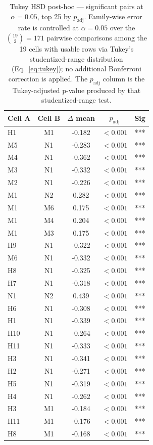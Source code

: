 \begin{table}[!htbp]
\centering
\caption{Tukey HSD post-hoc — significant pairs at $\alpha = 0.05$, top 25 by $p_{\text{adj}}$. Family-wise error rate is controlled at $\alpha = 0.05$ over the $\binom{19}{2} = 171$ pairwise comparisons among the 19 cells with usable rows via Tukey's studentized-range distribution (Eq.~\ref{eq:tukey}); no additional Bonferroni correction is applied. The $p_{\text{adj}}$ column is the Tukey-adjusted p-value produced by that studentized-range test.}
\label{tab:tukey_significant}
\begin{tabular}{@{}lcccc@{}}
\toprule
Cell A & Cell B & $\Delta$ mean & $p_{\text{adj}}$ & Sig \\
\midrule
H1 & M1 & -0.182 & $<0.001$ & *** \\
M5 & N1 & -0.283 & $<0.001$ & *** \\
M4 & N1 & -0.362 & $<0.001$ & *** \\
M3 & N1 & -0.332 & $<0.001$ & *** \\
M2 & N1 & -0.226 & $<0.001$ & *** \\
M1 & N2 & 0.282 & $<0.001$ & *** \\
M1 & M6 & 0.175 & $<0.001$ & *** \\
M1 & M4 & 0.204 & $<0.001$ & *** \\
M1 & M3 & 0.175 & $<0.001$ & *** \\
H9 & N1 & -0.322 & $<0.001$ & *** \\
M6 & N1 & -0.332 & $<0.001$ & *** \\
H8 & N1 & -0.325 & $<0.001$ & *** \\
H7 & N1 & -0.318 & $<0.001$ & *** \\
N1 & N2 & 0.439 & $<0.001$ & *** \\
H6 & N1 & -0.308 & $<0.001$ & *** \\
H1 & N1 & -0.339 & $<0.001$ & *** \\
H10 & N1 & -0.264 & $<0.001$ & *** \\
H11 & N1 & -0.333 & $<0.001$ & *** \\
H3 & N1 & -0.341 & $<0.001$ & *** \\
H2 & N1 & -0.271 & $<0.001$ & *** \\
H5 & N1 & -0.319 & $<0.001$ & *** \\
H4 & N1 & -0.262 & $<0.001$ & *** \\
H3 & M1 & -0.184 & $<0.001$ & *** \\
H11 & M1 & -0.176 & $<0.001$ & *** \\
H8 & M1 & -0.168 & $<0.001$ & *** \\
\bottomrule
\end{tabular}
\end{table}
